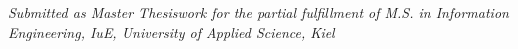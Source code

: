 \documentclass[]{report} %
\begin{document}
\begin{titlepage}
	\begin{center}
		\vspace*{\fill}
		{\large \textit{Submitted as Master Thesiswork for the partial fulfillment of M.S. in Information Engineering, IuE, University of Applied Science, Kiel}}\\[1cm]
		\vspace*{\fill}
	\end{center}
\end{titlepage}

\shipout\null {}

\startpreamble





\tableofcontents %


\mainmatter %



\numberedchapter











\begin{thebibliography}{9}
 
\end{thebibliography}
\end{document}
